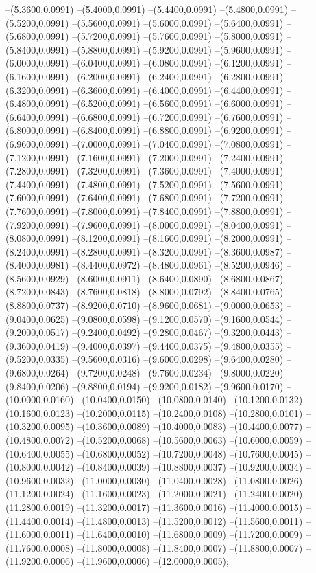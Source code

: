 {	--(5.3600,0.0991)
	--(5.4000,0.0991)
	--(5.4400,0.0991)
	--(5.4800,0.0991)
	--(5.5200,0.0991)
	--(5.5600,0.0991)
	--(5.6000,0.0991)
	--(5.6400,0.0991)
	--(5.6800,0.0991)
	--(5.7200,0.0991)
	--(5.7600,0.0991)
	--(5.8000,0.0991)
	--(5.8400,0.0991)
	--(5.8800,0.0991)
	--(5.9200,0.0991)
	--(5.9600,0.0991)
	--(6.0000,0.0991)
	--(6.0400,0.0991)
	--(6.0800,0.0991)
	--(6.1200,0.0991)
	--(6.1600,0.0991)
	--(6.2000,0.0991)
	--(6.2400,0.0991)
	--(6.2800,0.0991)
	--(6.3200,0.0991)
	--(6.3600,0.0991)
	--(6.4000,0.0991)
	--(6.4400,0.0991)
	--(6.4800,0.0991)
	--(6.5200,0.0991)
	--(6.5600,0.0991)
	--(6.6000,0.0991)
	--(6.6400,0.0991)
	--(6.6800,0.0991)
	--(6.7200,0.0991)
	--(6.7600,0.0991)
	--(6.8000,0.0991)
	--(6.8400,0.0991)
	--(6.8800,0.0991)
	--(6.9200,0.0991)
	--(6.9600,0.0991)
	--(7.0000,0.0991)
	--(7.0400,0.0991)
	--(7.0800,0.0991)
	--(7.1200,0.0991)
	--(7.1600,0.0991)
	--(7.2000,0.0991)
	--(7.2400,0.0991)
	--(7.2800,0.0991)
	--(7.3200,0.0991)
	--(7.3600,0.0991)
	--(7.4000,0.0991)
	--(7.4400,0.0991)
	--(7.4800,0.0991)
	--(7.5200,0.0991)
	--(7.5600,0.0991)
	--(7.6000,0.0991)
	--(7.6400,0.0991)
	--(7.6800,0.0991)
	--(7.7200,0.0991)
	--(7.7600,0.0991)
	--(7.8000,0.0991)
	--(7.8400,0.0991)
	--(7.8800,0.0991)
	--(7.9200,0.0991)
	--(7.9600,0.0991)
	--(8.0000,0.0991)
	--(8.0400,0.0991)
	--(8.0800,0.0991)
	--(8.1200,0.0991)
	--(8.1600,0.0991)
	--(8.2000,0.0991)
	--(8.2400,0.0991)
	--(8.2800,0.0991)
	--(8.3200,0.0991)
	--(8.3600,0.0987)
	--(8.4000,0.0981)
	--(8.4400,0.0972)
	--(8.4800,0.0961)
	--(8.5200,0.0946)
	--(8.5600,0.0929)
	--(8.6000,0.0911)
	--(8.6400,0.0890)
	--(8.6800,0.0867)
	--(8.7200,0.0843)
	--(8.7600,0.0818)
	--(8.8000,0.0792)
	--(8.8400,0.0765)
	--(8.8800,0.0737)
	--(8.9200,0.0710)
	--(8.9600,0.0681)
	--(9.0000,0.0653)
	--(9.0400,0.0625)
	--(9.0800,0.0598)
	--(9.1200,0.0570)
	--(9.1600,0.0544)
	--(9.2000,0.0517)
	--(9.2400,0.0492)
	--(9.2800,0.0467)
	--(9.3200,0.0443)
	--(9.3600,0.0419)
	--(9.4000,0.0397)
	--(9.4400,0.0375)
	--(9.4800,0.0355)
	--(9.5200,0.0335)
	--(9.5600,0.0316)
	--(9.6000,0.0298)
	--(9.6400,0.0280)
	--(9.6800,0.0264)
	--(9.7200,0.0248)
	--(9.7600,0.0234)
	--(9.8000,0.0220)
	--(9.8400,0.0206)
	--(9.8800,0.0194)
	--(9.9200,0.0182)
	--(9.9600,0.0170)
	--(10.0000,0.0160)
	--(10.0400,0.0150)
	--(10.0800,0.0140)
	--(10.1200,0.0132)
	--(10.1600,0.0123)
	--(10.2000,0.0115)
	--(10.2400,0.0108)
	--(10.2800,0.0101)
	--(10.3200,0.0095)
	--(10.3600,0.0089)
	--(10.4000,0.0083)
	--(10.4400,0.0077)
	--(10.4800,0.0072)
	--(10.5200,0.0068)
	--(10.5600,0.0063)
	--(10.6000,0.0059)
	--(10.6400,0.0055)
	--(10.6800,0.0052)
	--(10.7200,0.0048)
	--(10.7600,0.0045)
	--(10.8000,0.0042)
	--(10.8400,0.0039)
	--(10.8800,0.0037)
	--(10.9200,0.0034)
	--(10.9600,0.0032)
	--(11.0000,0.0030)
	--(11.0400,0.0028)
	--(11.0800,0.0026)
	--(11.1200,0.0024)
	--(11.1600,0.0023)
	--(11.2000,0.0021)
	--(11.2400,0.0020)
	--(11.2800,0.0019)
	--(11.3200,0.0017)
	--(11.3600,0.0016)
	--(11.4000,0.0015)
	--(11.4400,0.0014)
	--(11.4800,0.0013)
	--(11.5200,0.0012)
	--(11.5600,0.0011)
	--(11.6000,0.0011)
	--(11.6400,0.0010)
	--(11.6800,0.0009)
	--(11.7200,0.0009)
	--(11.7600,0.0008)
	--(11.8000,0.0008)
	--(11.8400,0.0007)
	--(11.8800,0.0007)
	--(11.9200,0.0006)
	--(11.9600,0.0006)
	--(12.0000,0.0005);
}
